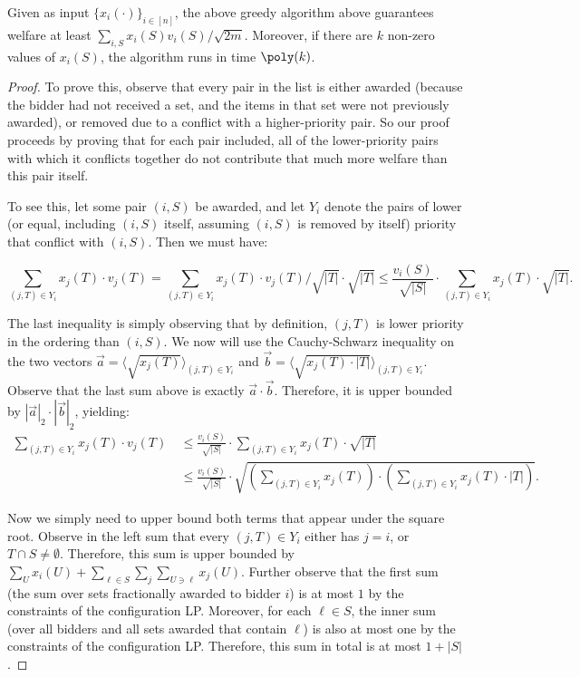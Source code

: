 \begin{theorem} Given as input $\{x_i(\cdot)\}_{i \in [n]}$, the above greedy algorithm above guarantees welfare at least $\sum_{i, S} x_i(S) v_i(S)/\sqrt{2m}$. Moreover, if there are $k$ non-zero values of $x_i(S)$, the algorithm runs in time $\poly(k)$. 
\end{theorem}
\begin{proof}
To prove this, observe that every pair in the list is either awarded (because the bidder had not received a set, and the items in that set were not previously awarded), or removed due to a conflict with a higher-priority pair. So our proof proceeds by proving that for each pair included, all of the lower-priority pairs with which it conflicts together do not contribute that much more welfare than this pair itself.

To see this, let some pair $(i,S)$ be awarded, and let $Y_i$ denote the pairs of lower (or equal, including $(i,S)$ itself, assuming $(i,S)$ is removed by itself) priority that conflict with $(i,S)$. Then we must have:

$$\sum_{(j, T) \in Y_i} x_j(T) \cdot v_j(T) = \sum_{(j, T) \in Y_i} x_j(T) \cdot v_j(T) /\sqrt{|T|} \cdot \sqrt{|T|} \leq \frac{v_i(S)}{\sqrt{|S|}} \cdot \sum_{(j, T) \in Y_i} x_j(T) \cdot \sqrt{|T|}.$$


The last inequality is simply observing that by definition, $(j,T)$ is lower priority in the ordering than $(i,S)$. We now will use the Cauchy-Schwarz inequality on the two vectors $\vec{a} = \langle \sqrt{x_j(T)}\rangle_{(j,T)\in Y_i}$ and $\vec{b} = \langle \sqrt{x_j(T) \cdot |T|}\rangle_{(j,T)\in Y_i}$. Observe that the last sum above is exactly $\vec{a} \cdot \vec{b}$. Therefore, it is upper bounded by $|\vec{a}|_2 \cdot |\vec{b}|_2$, yielding:
\begin{align*}
    \sum_{(j, T) \in Y_i} x_j(T) \cdot v_j(T)
    ~&\leq \frac{v_i(S)}{\sqrt{|S|}} \cdot \sum_{(j, T) \in Y_i} x_j(T) \cdot \sqrt{|T|}\\
    ~&\leq \frac{v_i(S)}{\sqrt{|S|}} \cdot \sqrt{\left(\sum_{(j,T) \in Y_i} x_j(T)\right) \cdot \left(\sum_{(j,T) \in Y_i} x_j(T) \cdot |T|\right)}.
\end{align*}

Now we simply need to upper bound both terms that appear under the square root. Observe in the left sum that every $(j,T) \in Y_i$ either has $j = i$, or $T \cap S \neq \emptyset$. Therefore, this sum is upper bounded by $\sum_U x_i(U) + \sum_{\ell \in S} \sum_j \sum_{U \ni \ell} x_j(U)$. Further observe that the first sum (the sum over sets fractionally awarded to bidder $i$) is at most $1$ by the constraints of the configuration LP. Moreover, for each $\ell \in S$, the inner sum (over all bidders and all sets awarded that contain $\ell$) is also at most one by the constraints of the configuration LP. Therefore, this sum in total is at most $1+|S|$. 


\end{proof}
